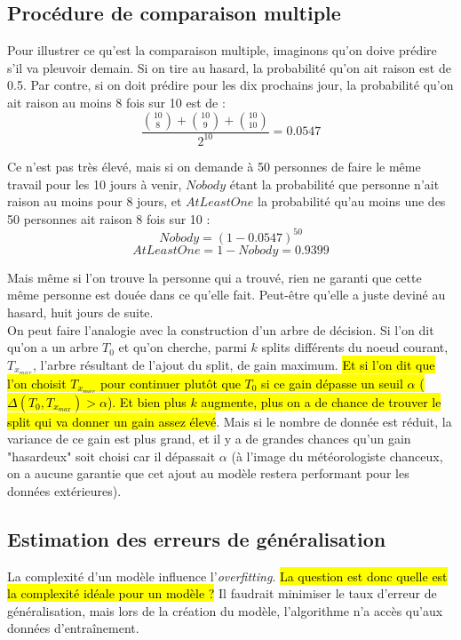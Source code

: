 \documentclass[letterpaper, 12pt]{article}
\newcommand{\alinea}{
\hspace*{0.5cm}}
\begin{document}
		\subsection{Procédure de comparaison multiple}
			\alinea Pour illustrer ce qu'est la comparaison multiple,
				imaginons qu'on doive prédire s'il va pleuvoir demain.
				Si on tire au hasard, la probabilité qu'on ait raison
				est de 0.5. Par contre, si on doit prédire pour les 
				dix prochains jour, la probabilité qu'on ait raison
				au moins 8 fois sur 10 est de :
				$$ \frac{\binom{10}{8} + \binom{10}{9} + \binom{10}{10}}%
						{2^{10}} = 0.0547 $$
			\alinea Ce n'est pas très élevé, mais si on demande à 50
				personnes de faire le même travail pour les 10 jours à venir,
				$Nobody$ étant la probabilité que personne n'ait raison
				au moins pour 8 jours, et $AtLeastOne$ la probabilité qu'au
				moins une des 50 personnes ait raison 8 fois sur 10 :
				$$ Nobody = (1-0.0547)^{50} $$
				$$ AtLeastOne = 1 - Nobody = 0.9399 $$
			\alinea Mais même si l'on trouve la personne qui a trouvé, 
				rien ne garanti que cette même personne est douée dans
				ce qu'elle fait. Peut-être qu'elle a juste deviné au hasard, 
				huit jours de suite.\\
			\alinea On peut faire l'analogie avec la construction d'un arbre
				de décision. Si l'on dit qu'on a un arbre $T_0$ et qu'on
				cherche, parmi $k$ splits différents du noeud courant, 
				$T_{x_{max}}$, l'arbre résultant de l'ajout du split, de
				gain maximum.\hl{ Et si l'on dit que l'on choisit $T_{x_{max}}$
				pour continuer plutôt que $T_0$ si ce gain dépasse un 
				seuil $\alpha$ ($\Delta(T_0, T_{x_{max}}) > \alpha$).
				Et bien plus $k$ augmente, plus on a de chance de trouver 
				le split qui va donner un gain assez élevé}. Mais 
				si le nombre de donnée est réduit, la variance de ce gain
				est plus grand, et il y a de grandes chances qu'un gain
				"hasardeux" soit choisi car il dépassait $\alpha$ (à l'image
				du météorologiste chanceux, on a aucune garantie que cet
				ajout au modèle restera performant pour les données
				extérieures).
		\subsection{Estimation des erreurs de généralisation}
			\alinea La complexité d'un modèle influence l'\textit{overfitting}.
				\hl{La question est donc quelle est la complexité idéale pour
				un modèle ?} Il faudrait minimiser le taux d'erreur de 
				généralisation, mais lors de la création du modèle, 
				l'algorithme n'a accès qu'aux données d'entraînement.
\end{document}
